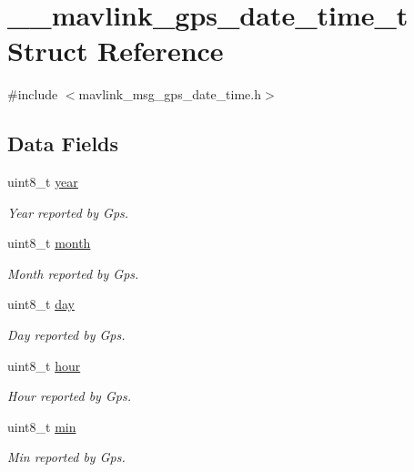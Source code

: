 \hypertarget{struct____mavlink__gps__date__time__t}{\section{\+\_\+\+\_\+mavlink\+\_\+gps\+\_\+date\+\_\+time\+\_\+t Struct Reference}
\label{struct____mavlink__gps__date__time__t}
}


{\ttfamily \#include $<$mavlink\+\_\+msg\+\_\+gps\+\_\+date\+\_\+time.\+h$>$}

\subsection*{Data Fields}
\begin{DoxyCompactItemize}
\item 
uint8\+\_\+t \hyperlink{struct____mavlink__gps__date__time__t_a4c31911d1e228a27edc844a6b3de9649}{year}
\begin{DoxyCompactList}\small\item\em Year reported by Gps. \end{DoxyCompactList}\item 
uint8\+\_\+t \hyperlink{struct____mavlink__gps__date__time__t_a44b17003a2485dc80dc6504c00342457}{month}
\begin{DoxyCompactList}\small\item\em Month reported by Gps. \end{DoxyCompactList}\item 
uint8\+\_\+t \hyperlink{struct____mavlink__gps__date__time__t_ab2d94b0c477cc22a2947bcdad0071487}{day}
\begin{DoxyCompactList}\small\item\em Day reported by Gps. \end{DoxyCompactList}\item 
uint8\+\_\+t \hyperlink{struct____mavlink__gps__date__time__t_a7cbd5aeeb68f7205f0539eaa1941dedd}{hour}
\begin{DoxyCompactList}\small\item\em Hour reported by Gps. \end{DoxyCompactList}\item 
uint8\+\_\+t \hyperlink{struct____mavlink__gps__date__time__t_a19dabe59973f6702b2f93a404bf3e36c}{min}
\begin{DoxyCompactList}\small\item\em Min reported by Gps. \end{DoxyCompactList}\item 

\end{DoxyCompactItemize}
